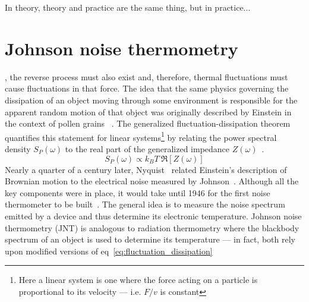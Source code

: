 \begin{savequote}[75mm]
In theory, theory and practice are the same thing, but in practice...
\end{savequote}

\chapter{Johnson noise thermometry}
\label{ch:johnson_noise_thermometry}

, the reverse process must also exist and, therefore, thermal fluctuations must cause fluctuations in that force. The idea that the same physics governing the dissipation of an object moving through some environment is responsible for the apparent random motion of that object was originally described by Einstein in the context of pollen grains ~\cite{einstein_investigations_1956}. The generalized fluctuation-dissipation theorem~\cite{kubo_fluctuation-dissipation_1966} quantifies this statement for linear systems\footnote{Here a linear system is one where the force acting on a particle is proportional to its velocity --- i.e. $F/v$ is constant} by relating the power spectral density $S_P(\omega)$ to the real part of the generalized impedance $Z(\omega)$~\cite{callen_irreversibility_1951}.
\begin{equation}\label{eq:fluctuation_dissipation}
S_P(\omega) \propto k_BT\ \Re[Z(\omega)]
\end{equation}
Nearly a quarter of a century later, Nyquist~\cite{nyquist_thermal_1928} related Einstein's description of Brownian motion to the electrical noise measured by Johnson~\cite{johnson_thermal_1927,johnson_thermal_1928}. Although all the key components were in place, it would take until 1946 for the first noise thermometer to be built~\cite{dicke_measurement_1946}. The general idea is to measure the noise spectrum emitted by a device and thus determine its electronic temperature. Johnson noise thermometry (JNT) is analogous to radiation thermometry where the blackbody spectrum of an object is used to determine its temperature --- in fact, both rely upon modified versions of eq~\ref{eq:fluctuation_dissipation}


